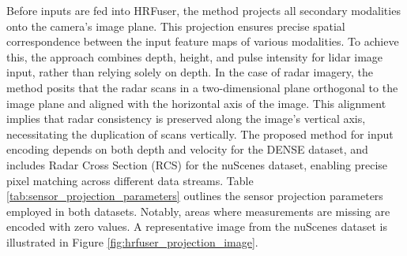 \documentclass[report.tex]{subfiles}
\begin{document}

    Before inputs are fed into HRFuser, the method projects all secondary modalities onto the camera's image plane. This projection ensures precise spatial correspondence between the input feature maps of various modalities. To achieve this, the approach combines depth, height, and pulse intensity for lidar image input, rather than relying solely on depth. In the case of radar imagery, the method posits that the radar scans in a two-dimensional plane orthogonal to the image plane and aligned with the horizontal axis of the image. This alignment implies that radar consistency is preserved along the image's vertical axis, necessitating the duplication of scans vertically. The proposed method for input encoding depends on both depth and velocity for the DENSE dataset, and includes Radar Cross Section (RCS) for the nuScenes dataset, enabling precise pixel matching across different data streams. Table \ref{tab:sensor_projection_parameters} outlines the sensor projection parameters employed in both datasets. Notably, areas where measurements are missing are encoded with zero values. A representative image from the nuScenes dataset is illustrated in Figure \ref{fig:hrfuser_projection_image}.
\end{document}

